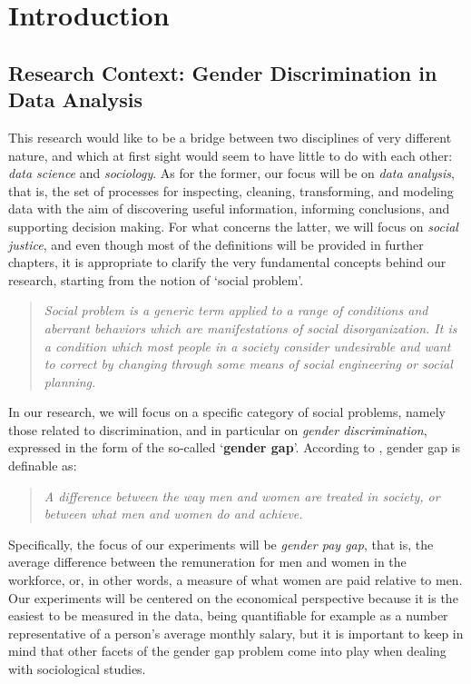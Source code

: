 \chapter{Introduction}
\label{chapter:introduction}
\thispagestyle{empty}


\section{Research Context: Gender Discrimination in Data Analysis}
This research would like to be a bridge between two disciplines of very different nature, and which at first sight would seem to have little to do with each other: \textit{data science} and \textit{sociology}. As for the former, our focus will be on \textit{data analysis}, that is, the set of processes for inspecting, cleaning, transforming, and modeling data with the aim of discovering useful information, informing conclusions, and supporting decision making. For what concerns the latter, we will focus on \textit{social justice}, and even though most of the definitions will be provided in further chapters, it is appropriate to clarify the very 
fundamental concepts behind our research, starting from the notion of `social problem'.
\begin{quote}\emph{Social problem is a generic term applied to a range of conditions and aberrant behaviors which are manifestations of social disorganization. It is a condition which most people in a society consider undesirable and want to correct by changing through some means of social engineering or social planning.} \cite{marschall1998oxford}\end{quote}

In our research, we will focus on a specific category of social problems, namely those related to discrimination, and in particular on \textit{gender discrimination}, expressed in the form of the so-called `\textbf{gender gap}'. According to \cite{cambridge2013gender}, gender gap is definable as:
\begin{quote}\emph{A difference between the way men and women are treated in society, or between what men and women do and achieve.} \cite{cambridge2013gender}\end{quote}

Specifically, the focus of our experiments will be \textit{gender pay gap}, that is, the average difference between the remuneration for men and women in the workforce, or, in other words, a measure of what women are paid relative to men. Our experiments will be centered on the economical perspective because it is the easiest to be measured in the data, being quantifiable for example as a number representative of a person's average monthly salary, but it is important to keep in mind that other facets of the gender gap problem come into play when dealing with sociological studies.


